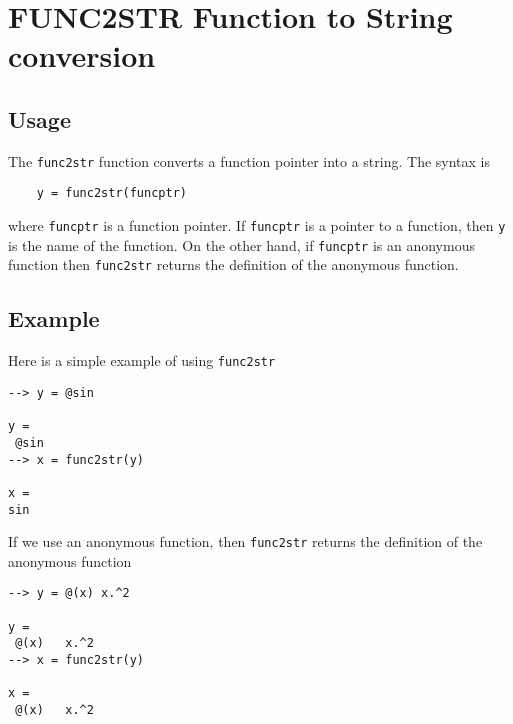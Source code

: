 \section{FUNC2STR Function to String conversion}

\subsection{Usage}

The \verb|func2str| function converts a function pointer into a
string.  The syntax is
\begin{verbatim}
    y = func2str(funcptr)
\end{verbatim}
where \verb|funcptr| is a function pointer.  If \verb|funcptr| is a 
pointer to a function, then \verb|y| is the name of the function.
On the other hand, if \verb|funcptr| is an anonymous function then
\verb|func2str| returns the definition of the anonymous function.
\subsection{Example}

Here is a simple example of using \verb|func2str|
\begin{verbatim}
--> y = @sin

y = 
 @sin
--> x = func2str(y)

x = 
sin
\end{verbatim}
If we use an anonymous function, then \verb|func2str|
returns the definition of the anonymous function
\begin{verbatim}
--> y = @(x) x.^2

y = 
 @(x)   x.^2
--> x = func2str(y)

x = 
 @(x)   x.^2
\end{verbatim}
